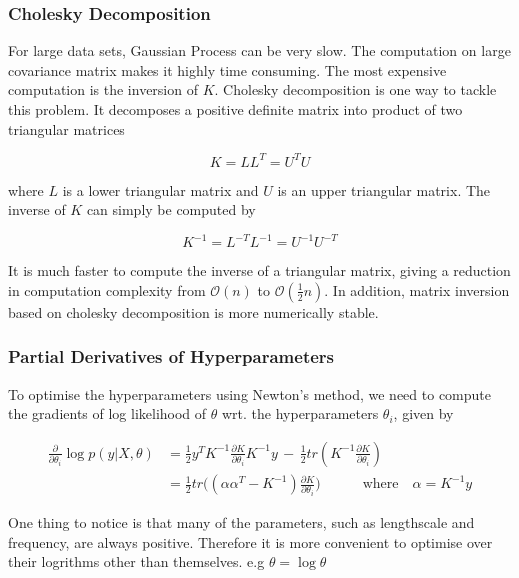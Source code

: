 \documentclass[14pt]{report}
\numberwithin{equation}{chapter}
\begin{document}
\begin{spacing}{2}
\subsubsection{Cholesky Decomposition}
For large data sets, Gaussian Process can be very slow. The computation on large covariance matrix makes it highly time consuming. The most expensive computation is the inversion of $K$. Cholesky decomposition is one way to tackle this problem. It decomposes a positive definite matrix into product of two triangular matrices

\begin{equation}
K = LL^T = U^TU
\end{equation}

where $L$ is a lower triangular matrix and $U$ is an upper triangular matrix. The inverse of $K$ can simply be computed by

\begin{equation}
K^{-1} = L^{-T}L^{-1} = U^{-1}U^{-T}
\end{equation}

It is much faster to compute the inverse of a triangular matrix, giving a reduction in computation complexity from $\mathcal{O}(n)$ to $\mathcal{O}(\frac{1}{2}n)$\cite{marelli2015distributed}. In addition, matrix inversion based on cholesky decomposition is more numerically stable.  


\subsubsection{Partial Derivatives of Hyperparameters}
To optimise the hyperparameters using Newton's method, we need to compute the gradients of log likelihood of $\theta$ wrt. the hyperparameters $\theta_i$, given by 
 
\begin{equation}
\begin{split}
\frac{\partial}{\partial \theta_i} \operatorname{log}p(y|X,\theta) & = \frac{1}{2}y^T K^{-1}\frac{\partial K}{\partial \theta_i}K^{-1}y \, - \, \frac{1}{2}tr(K^{-1}\frac{\partial K}{\partial \theta_i}) \\ & = \frac{1}{2}tr\big( (\alpha\alpha^T - K^{-1})\frac{\partial K}{\partial \theta_i}\big) \quad\quad\quad \mbox{where}\quad\alpha = K^{-1}y
\end{split}
\end{equation}

One thing to notice is that many of the parameters, such as lengthscale and frequency, are always positive. Therefore it is more convenient to optimise over their logrithms other than themselves. e.g $\theta = \operatorname{log}\theta$ 










\end{spacing}
\end{document}
